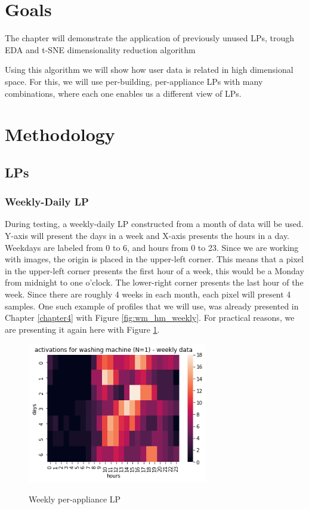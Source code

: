 \section{Goals}

The chapter will demonstrate the application of previously unused LPs,
trough EDA and t-SNE dimensionality reduction algorithm

Using this algorithm we will show how user data is related in high dimensional space.
For this, we will use per-building, per-appliance LPs with many combinations, where
each one enables us a different view of LPs. 

\section{Methodology}

\subsection{LPs}

\subsubsection{Weekly-Daily LP}

During testing, a weekly-daily LP constructed from a month of data will be used.
Y-axis will present the days in a week and X-axis presents the hours in a day.
Weekdays are labeled from 0 to 6, and hours from 0 to 23.
Since we are working with images, the origin is placed in the upper-left corner. 
This means that a pixel in the upper-left corner presents the first hour of a week,
this would be a Monday from midnight to one o'clock. 
The lower-right corner presents the last hour of the week.
Since there are roughly 4 weeks in each month, each pixel will present 4 samples. 
One such example of profiles that we will use, was already presented in Chapter \ref{chapter4} with Figure \ref{fig:wm_hm_weekly}.
For practical reasons, we are presenting it again here with Figure \ref{fig:wm_hm_weekly_2}.

\begin{figure}[H]
	\centering
	\caption{Weekly per-appliance LP}
	\includegraphics[width=0.7\textwidth]{../Figures/LPS/wm_hm_weekly.png}
	\label{fig:wm_hm_weekly_2}
\end{figure}

